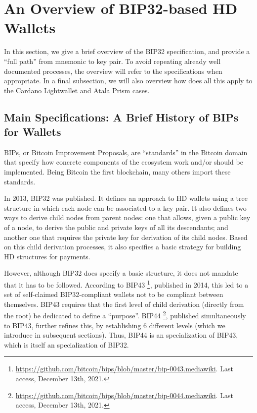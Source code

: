 \section{An Overview of BIP32-based HD Wallets}
\label{sec:bip32}

In this section, we give a brief overview of the BIP32 specification, and
provide a ``full path'' from mnemonic to key pair. To avoid repeating already
well documented processes, the overview will refer to the specifications when
appropriate.
%
In a final subsection, we will also overview how does all this apply to the
Cardano Lightwallet and Atala Prism cases.

\subsection{Main Specifications: A Brief History of BIPs for Wallets}

BIPs, or Bitcoin Improvement Proposals, are ``standards'' in the Bitcoin domain
that specify how concrete components of the ecosystem work and/or should be
implemented. Being Bitcoin the first blockchain, many others import these
standards.

In 2013, BIP32 was published. It defines an approach to HD wallets
using a tree structure in which each node can be associated to a key pair. It
also defines two ways to derive child nodes from parent nodes: one that allows,
given a public key of a node, to derive the public and private keys of all its
descendants; and another one that requires the private key for derivation of
its child nodes. Based on this child derivation processes, it also specifies a
basic strategy for building HD structures for payments.

However, although BIP32 does specify a basic structure, it does not mandate that
it has to be followed. According to BIP43%
\footnote{\url{https://github.com/bitcoin/bips/blob/master/bip-0043.mediawiki}.
  Last access, December 13th, 2021.}, published in 2014, this led to a set of
self-claimed BIP32-compliant wallets not to be compliant between themselves.
BIP43 requires that the first level of child derivation (directly from the
root) be dedicated to define a ``purpose''. BIP44%
\footnote{\url{https://github.com/bitcoin/bips/blob/master/bip-0044.mediawiki}.
  Last access, December 13th, 2021.}, published simultaneously to BIP43, further
refines this, by establishing 6 different levels (which we introduce in
subsequent sections). Thus, BIP44 is an specialization of BIP43, which is itself
an specialization of BIP32.

